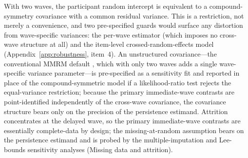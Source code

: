 With two waves, the participant random intercept is equivalent to a compound-symmetry covariance with a common residual variance. This is a restriction, not merely a convenience, and two pre-specified guards would surface any distortion from wave-specific variances: the per-wave \textcite{lin2013} estimator (which imposes no cross-wave structure at all) and the item-level crossed-random-effects model (Appendix~\ref{app:robustness}, item~4). An unstructured covariance---the conventional MMRM default \parencite{mallinckrodt2008}, which with only two waves adds a single wave-specific variance parameter---is pre-specified as a sensitivity fit and reported in place of the compound-symmetric model if a likelihood-ratio test rejects the equal-variance restriction; because the primary immediate-wave contrasts are point-identified independently of the cross-wave covariance, the covariance structure bears only on the precision of the persistence estimand. Attrition concentrates at the delayed wave, so the primary immediate-wave contrasts are essentially complete-data by design; the missing-at-random assumption bears on the persistence estimand and is probed by the multiple-imputation and Lee-bounds sensitivity analyses (Missing data and attrition).


